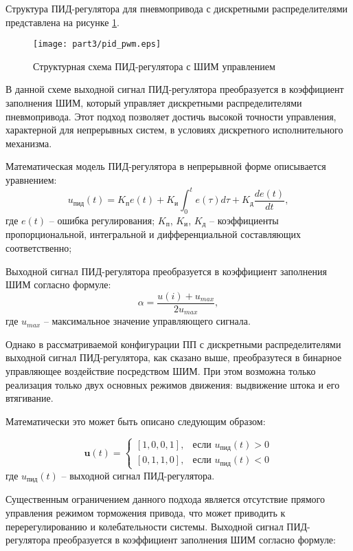 Структура ПИД-регулятора для пневмопривода
с дискретными распределителями представлена на рисунке \ref{fig:ch3:pid_pwm_control}.

\begin{figure}[ht]
	\centering
	\texttt{[image: part3/pid\_pwm.eps]}
	\caption{Структурная схема ПИД-регулятора с ШИМ управлением}
	\label{fig:ch3:pid_pwm_control}
\end{figure}

В данной схеме выходной сигнал ПИД-регулятора преобразуется в коэффициент
заполнения ШИМ, который управляет дискретными распределителями
пневмопривода. Этот подход позволяет достичь высокой точности
управления, характерной для непрерывных систем, в условиях
дискретного исполнительного механизма.

Математическая модель ПИД-регулятора в непрерывной форме описывается уравнением:
\begin{equation}\label{eq:pid_base}
	u_{\text{пид}}(t) = K_{\text{п}} e(t) + K_{\text{и}} \int_0^t e(\tau)d\tau + K_{\text{д}}\frac{de(t)}{dt},
\end{equation}
где
$e(t)$ -- ошибка регулирования;
$K_\text{п}$, $K_\text{и}$, $K_\text{д}$ -- коэффициенты пропорциональной, интегральной и
дифференциальной составляющих соответственно;

Выходной сигнал ПИД-регулятора преобразуется в коэффициент заполнения ШИМ согласно формуле:
\begin{equation}
	\alpha = \frac{u(i) + u_{max}}{2u_{max}},
\end{equation}
где $u_{max}$ -- максимальное значение управляющего сигнала.

Однако в рассматриваемой конфигурации ПП с дискретными распределителями
выходной сигнал ПИД-регулятора, как сказано выше, преобразутеся в бинарное
управляющее воздействие посредством ШИМ. При этом возможна только реализация
только двух основных режимов движения: выдвижение штока и его втягивание.

Математически это может быть описано следующим образом:

\begin{equation}
	\mathbf{u}(t) = \begin{cases}
		[1,0,0,1], & \text{если } u_\text{пид}(t) > 0 \\
		[0,1,1,0], & \text{если } u_\text{пид}(t) < 0
	\end{cases}
\end{equation}
где $u_\text{пид}(t)$ -- выходной сигнал ПИД-регулятора.

Существенным ограничением данного подхода является отсутствие
прямого управления режимом торможения привода, что может приводить к
перерегулированию и колебательности системы. Выходной сигнал ПИД-регулятора
преобразуется в коэффициент заполнения ШИМ согласно формуле:

